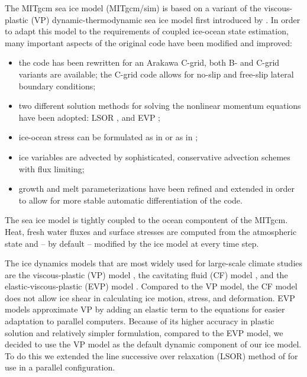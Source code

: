 The MITgcm sea ice model (MITgcm/sim) is based on a variant of the
viscous-plastic (VP) dynamic-thermodynamic sea ice model \citep{zhang97}
first introduced by \citet{hib79, hib80}. In order to adapt this model
to the requirements of coupled ice-ocean state estimation, many
important aspects of the original code have been modified and
improved:
\begin{itemize}
\item the code has been rewritten for an Arakawa C-grid, both B- and
  C-grid variants are available; the C-grid code allows for no-slip
  and free-slip lateral boundary conditions;
\item two different solution methods for solving the nonlinear
  momentum equations have been adopted: LSOR \citep{zhang97}, and EVP
  \citep{hun97};
\item ice-ocean stress can be formulated as in \citet{hibler87} or as in
  \citet{cam08}; 
\item ice variables are advected by sophisticated, conservative
  advection schemes with flux limiting;
\item growth and melt parameterizations have been refined and extended
  in order to allow for more stable automatic differentiation of the code.
\end{itemize}
The sea ice model is tightly coupled to the ocean compontent of the
MITgcm.  Heat, fresh water fluxes and surface stresses are computed
from the atmospheric state and -- by default -- modified by the ice
model at every time step.

The ice dynamics models that are most widely used for large-scale
climate studies are the viscous-plastic (VP) model \citep{hib79}, the
cavitating fluid (CF) model \citep{fla92}, and the
elastic-viscous-plastic (EVP) model \citep{hun97}.  Compared to the VP
model, the CF model does not allow ice shear in calculating ice
motion, stress, and deformation.  EVP models approximate VP by adding
an elastic term to the equations for easier adaptation to parallel
computers.  Because of its higher accuracy in plastic solution and
relatively simpler formulation, compared to the EVP model, we decided
to use the VP model as the default dynamic component of our ice
model. To do this we extended the line successive over relaxation
(LSOR) method of \citet{zhang97} for use in a parallel
configuration.

